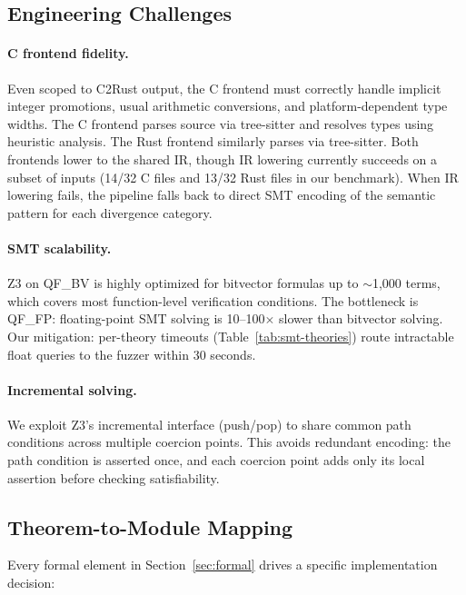 \documentclass[11pt]{article}
\begin{document}
\subsection{Engineering Challenges}
\label{sec:impl-challenges}

\paragraph{C frontend fidelity.}
Even scoped to C2Rust output, the C frontend must correctly handle implicit integer promotions, usual arithmetic conversions, and platform-dependent type widths. The C frontend parses source via tree-sitter and resolves types using heuristic analysis. The Rust frontend similarly parses via tree-sitter. Both frontends lower to the shared IR, though IR lowering currently succeeds on a subset of inputs (14/32 C files and 13/32 Rust files in our benchmark). When IR lowering fails, the pipeline falls back to direct SMT encoding of the semantic pattern for each divergence category.

\paragraph{SMT scalability.}
Z3 on QF\_BV is highly optimized for bitvector formulas up to $\sim$1,000 terms, which covers most function-level verification conditions. The bottleneck is QF\_FP: floating-point SMT solving is 10--100$\times$ slower than bitvector solving. Our mitigation: per-theory timeouts (Table~\ref{tab:smt-theories}) route intractable float queries to the fuzzer within 30 seconds.

\paragraph{Incremental solving.}
We exploit Z3's incremental interface (push/pop) to share common path conditions across multiple coercion points. This avoids redundant encoding: the path condition is asserted once, and each coercion point adds only its local assertion before checking satisfiability.

\subsection{Theorem-to-Module Mapping}
\label{sec:impl-mapping}

Every formal element in Section~\ref{sec:formal} drives a specific implementation decision:
\end{document}
